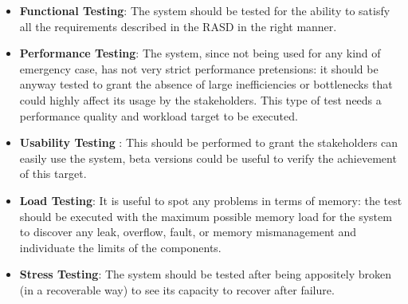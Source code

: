 \documentclass{article}
\begin{document}
\begin{itemize}
    \item \textbf{Functional Testing}: The system should be tested for the ability to satisfy all the requirements described in the RASD in the right manner.
    \item \textbf{Performance Testing}: The system, since not being used for any kind of emergency case, has not very strict performance pretensions: it should be anyway tested to grant the absence of large
    inefficiencies or bottlenecks that could highly affect its usage by the stakeholders.
    This type of test needs a performance quality and workload target to be executed.
    \item \textbf{Usability Testing} : This should be performed to grant the stakeholders can easily use the system, beta versions could be useful to verify the achievement of this target.
    \item \textbf{Load Testing}: It is useful to spot any problems in terms of memory: the test should be executed with the maximum possible memory load for the system to discover any leak, overflow, fault, or memory mismanagement and individuate the limits of the components.
    \item \textbf{Stress Testing}: The system should be tested after being appositely broken (in a recoverable way) to see its capacity to recover after failure.
\end{itemize}
\newpage
\end{document}
